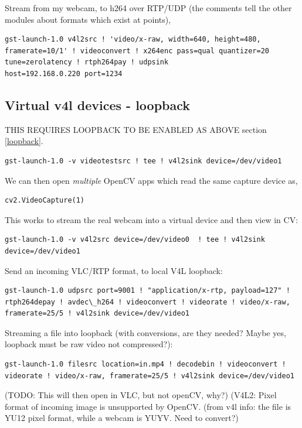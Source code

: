 \documentclass[oneside,english]{scrbook}
\begin{document}
Stream from my webcam, to h264 over RTP/UDP (the comments tell the other modules about formats which exist at points),
\begin{lstlisting}
gst-launch-1.0 v4l2src ! 'video/x-raw, width=640, height=480, framerate=10/1' ! videoconvert ! x264enc pass=qual quantizer=20 tune=zerolatency ! rtph264pay ! udpsink
host=192.168.0.220 port=1234
\end{lstlisting}


\subsection{Virtual v4l devices - loopback}

THIS REQUIRES LOOPBACK TO BE ENABLED AS ABOVE section \ref{loopback}.

\begin{lstlisting}
gst-launch-1.0 -v videotestsrc ! tee ! v4l2sink device=/dev/video1 
\end{lstlisting}

We can then open {\em multiple} OpenCV apps which read the same capture device as,
\begin{lstlisting}
cv2.VideoCapture(1)
\end{lstlisting}

This works to stream the real webcam into a virtual device and then view in CV:
\begin{lstlisting}
gst-launch-1.0 -v v4l2src device=/dev/video0  ! tee ! v4l2sink device=/dev/video1
\end{lstlisting}

Send an incoming VLC/RTP format, to local V4L loopback: 
\begin{lstlisting}
gst-launch-1.0 udpsrc port=9001 ! "application/x-rtp, payload=127" ! rtph264depay ! avdec\_h264 ! videoconvert ! videorate ! video/x-raw, framerate=25/5 ! v4l2sink device=/dev/video1
\end{lstlisting}

Streaming a file into loopback (with conversions, are they needed? Maybe yes, loopback must be raw video not compressed?):
\begin{lstlisting}
gst-launch-1.0 filesrc location=in.mp4 ! decodebin ! videoconvert ! videorate ! video/x-raw, framerate=25/5 ! v4l2sink device=/dev/video1
\end{lstlisting}
(TODO: This will then open in VLC, but not openCV, why?)
(V4L2: Pixel format of incoming image is unsupported by OpenCV.
(from v4l info: the file is YU12 pixel format, while a webcam is YUYV. Need to convert?)
\end{document}
